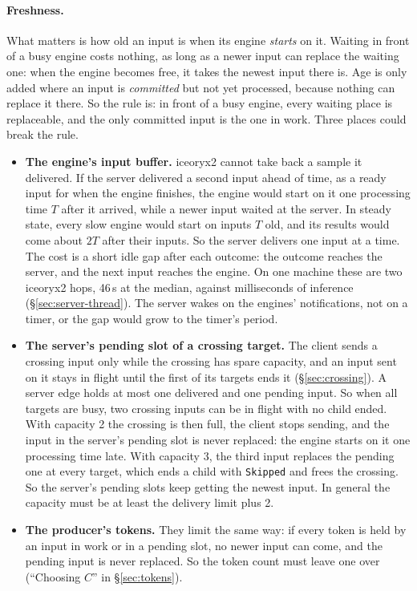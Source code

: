 \documentclass[11pt]{article}
\newcommand{\code}[1]{\texttt{#1}}
\begin{document}
\paragraph{Freshness.} What matters is how old an input is when its engine
\emph{starts} on it. Waiting in front of a busy engine costs nothing, as long
as a newer input can replace the waiting one: when the engine becomes free,
it takes the newest input there is. Age is only added where an input is
\emph{committed} but not yet processed, because nothing can replace it there.
So the rule is: in front of a busy engine, every waiting place is
replaceable, and the only committed input is the one in work. Three places
could break the rule.
\begin{itemize}[nosep]
  \item \textbf{The engine's input buffer.} iceoryx2 cannot take back a sample
        it delivered. If the server delivered a second input ahead of time, as
        a ready input for when the engine finishes, the engine would start on
        it one processing time $T$ after it arrived, while a newer input waited
        at the server. In steady state, every slow engine would start on
        inputs $T$ old, and its results would come about $2T$ after their
        inputs. So the server delivers one input at a time. The cost is a
        short idle gap after each outcome: the outcome reaches the server, and
        the next input reaches the engine. On one machine these are two
        iceoryx2 hops, 46\,\textmu s at the median, against milliseconds of
        inference (\S\ref{sec:server-thread}). The server wakes on the
        engines' notifications, not on a timer, or the gap would grow to the
        timer's period.
  \item \textbf{The server's pending slot of a crossing target.} The client
        sends a crossing input only while the crossing has spare capacity, and
        an input sent on it stays in flight until the first of its targets ends
        it (\S\ref{sec:crossing}). A server edge holds at most one delivered
        and one pending input. So when all targets are busy, two crossing
        inputs can be in flight with no child ended. With capacity 2 the
        crossing is then full, the client stops sending, and the input in the
        server's pending slot is never replaced: the engine starts on it one
        processing time late. With capacity 3, the third input replaces the
        pending one at every target, which ends a child with \code{Skipped}
        and frees the crossing. So the server's pending slots keep getting
        the newest input. In general the capacity must be at least the
        delivery limit plus 2.
  \item \textbf{The producer's tokens.} They limit the same way: if every
        token is held by an input in work or in a pending slot, no newer
        input can come, and the pending input is never replaced. So the token
        count must leave one over (``Choosing $C$'' in \S\ref{sec:tokens}).
\end{itemize}
\end{document}
